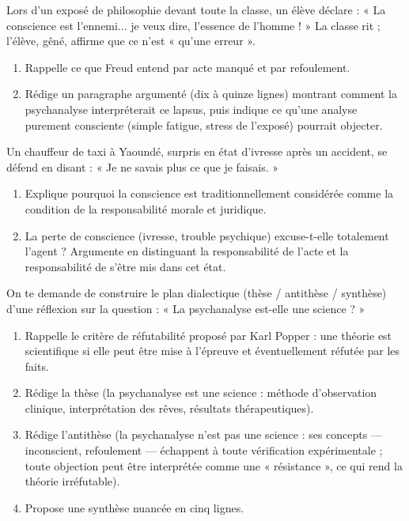 \documentclass[11pt]{article}
\newcommand{\cle}[1]{{\popxbold\color{popdark}#1}}
\begin{document}
\begin{exercice}
Lors d'un exposé de philosophie devant toute la classe, un élève déclare : « La conscience est l'ennemi... je veux dire, l'essence de l'homme ! » La classe rit ; l'élève, gêné, affirme que ce n'est « qu'une erreur ».
\begin{enumerate}
\item Rappelle ce que Freud entend par \cle{acte manqué} et par \cle{refoulement}.
\item Rédige un paragraphe argumenté (dix à quinze lignes) montrant comment la psychanalyse interpréterait ce lapsus, puis indique ce qu'une analyse purement consciente (simple fatigue, stress de l'exposé) pourrait objecter.
\end{enumerate}
\end{exercice}

\begin{exercice}
Un chauffeur de taxi à Yaoundé, surpris en état d'ivresse après un accident, se défend en disant : « Je ne savais plus ce que je faisais. »
\begin{enumerate}
\item Explique pourquoi la conscience est traditionnellement considérée comme la condition de la responsabilité morale et juridique.
\item La perte de conscience (ivresse, trouble psychique) excuse-t-elle totalement l'agent ? Argumente en distinguant la responsabilité de l'acte et la responsabilité de s'être mis dans cet état.
\end{enumerate}
\end{exercice}

\begin{exercice}
On te demande de construire le plan dialectique (thèse / antithèse / synthèse) d'une réflexion sur la question : « La psychanalyse est-elle une science ? »
\begin{enumerate}
\item Rappelle le critère de \cle{réfutabilité} proposé par Karl Popper : une théorie est scientifique si elle peut être mise à l'épreuve et éventuellement réfutée par les faits.
\item Rédige la thèse (la psychanalyse est une science : méthode d'observation clinique, interprétation des rêves, résultats thérapeutiques).
\item Rédige l'antithèse (la psychanalyse n'est pas une science : ses concepts — inconscient, refoulement — échappent à toute vérification expérimentale ; toute objection peut être interprétée comme une « résistance », ce qui rend la théorie irréfutable).
\item Propose une synthèse nuancée en cinq lignes.
\end{enumerate}
\end{exercice}
\end{document}
